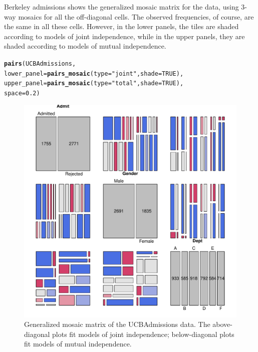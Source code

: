 \documentclass[11pt]{book}\usepackage[]{graphicx}\usepackage[]{color}
\makeatletter
\newcommand{\hlnum}[1]{\textcolor[rgb]{0.686,0.059,0.569}{#1}}%
\newcommand{\hlstr}[1]{\textcolor[rgb]{0.192,0.494,0.8}{#1}}%
\newcommand{\hlstd}[1]{\textcolor[rgb]{0.345,0.345,0.345}{#1}}%
\newcommand{\hlkwc}[1]{\textcolor[rgb]{0.333,0.667,0.333}{#1}}%
\newcommand{\hlkwd}[1]{\textcolor[rgb]{0.737,0.353,0.396}{\textbf{#1}}}%
\newenvironment{kframe}{%
 \def\at@end@of@kframe{}%
 \ifinner\ifhmode%
  \def\at@end@of@kframe{\end{minipage}}%
  \begin{minipage}{\columnwidth}%
 \fi\fi%
 \def\FrameCommand##1{\hskip\@totalleftmargin \hskip-\fboxsep
 \colorbox{shadecolor}{##1}\hskip-\fboxsep
     \hskip-\linewidth \hskip-\@totalleftmargin \hskip\columnwidth}%
 \MakeFramed {\advance\hsize-\width
   \@totalleftmargin\z@ \linewidth\hsize
   \@setminipage}}%
 {\par\unskip\endMakeFramed%
 \at@end@of@kframe}
\newenvironment{knitrout}{}{} %
\renewenvironment{knitrout}{\small\renewcommand{\baselinestretch}{.85}}{} %
\makeatother
\begin{document}
\begin{Example}[berkeley4b]{Berkeley admissions}
 shows the generalized mosaic matrix for the 
data, using 3-way mosaics for all the off-diagonal cells.
The observed frequencies, of course, are the same in all these cells.
However, in the lower panels, the tiles are shaded according to models of
joint independence, while in the upper panels, they are shaded according to
models of mutual independence.
\begin{knitrout}
\color{fgcolor}\begin{kframe}
\begin{alltt}
\hlkwd{pairs}\hlstd{(UCBAdmissions,}
      \hlkwc{lower_panel} \hlstd{=} \hlkwd{pairs_mosaic}\hlstd{(}\hlkwc{type} \hlstd{=} \hlstr{"joint"}\hlstd{,} \hlkwc{shade}\hlstd{=}\hlnum{TRUE}\hlstd{),}
      \hlkwc{upper_panel} \hlstd{=} \hlkwd{pairs_mosaic}\hlstd{(}\hlkwc{type} \hlstd{=} \hlstr{"total"}\hlstd{,} \hlkwc{shade}\hlstd{=}\hlnum{TRUE}\hlstd{),}
      \hlkwc{space}\hlstd{=}\hlnum{0.2}\hlstd{)}
\end{alltt}
\end{kframe}\begin{figure}[!htb]


\centerline{\includegraphics[width=.8\textwidth]{ch05/fig/berk-pairs2} }

\caption[Generalized mosaic matrix of the UCBAdmissions data]{Generalized mosaic matrix of the UCBAdmissions data. The above-diagonal plots fit models of joint independence; below-diagonal plots fit models of mutual independence.\label{fig:berk-pairs2}}
\end{figure}



\end{knitrout}
\end{Example}
\end{document}
